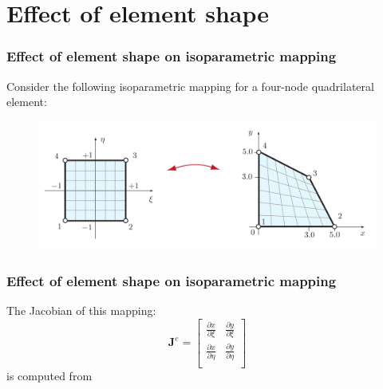 \documentclass[notes]{beamer}
\begin{document}
\section{Effect of element shape}
\begin{frame}
\frametitle{Effect of element shape on isoparametric mapping}
Consider the following isoparametric mapping for a four-node quadrilateral element:
\begin{figure}[ht]
	\centering
	\includegraphics[width=\textwidth]{figs/2d-isoparametric-example.png}
\end{figure}
\end{frame}

\begin{frame}
\frametitle{Effect of element shape on isoparametric mapping}
The Jacobian of this mapping:
\begin{equation*}
	\mathbf{J}^e%
	=%
	\begin{bmatrix}
		\frac{\partial x}{\partial \xi} & \frac{\partial y}{\partial \xi} \\
		\frac{\partial x}{\partial \eta} & \frac{\partial y}{\partial \eta} \\
	\end{bmatrix}
\end{equation*}
is computed from
\end{frame}
\end{document}
